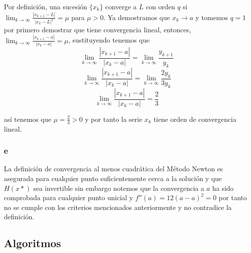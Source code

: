 \documentclass[conference]{IEEEtran}
\begin{document}
Por definición, una sucesión $\{x_k\}$ converge a $L$ con orden $q$ si
$\lim_{k \to \infty} \frac{|x_{k+1} - L|}{|x_k - L|^q} = \mu$ para $\mu > 0$. Ya demostramos que
$x_{k} \rightarrow a$ y tomemos $q=1$ por primero demostrar que tiene convergencia lineal,
entonces, $\lim_{k \to \infty} \frac{|x_{k+1} - a|}{|x_k - a|} = \mu$, sustituyendo tenemos que
$$
\lim_{k \to \infty} \frac{|x_{k+1} - a|}{|x_k - a|} = \lim_{k \to \infty} \frac{y_{k+1}}{y_k}
$$
$$
\lim_{k \to \infty} \frac{|x_{k+1} - a|}{|x_k - a|} = \lim_{k \to \infty} \frac{2y_{k}}{3y_k}
$$
$$
\lim_{k \to \infty} \frac{|x_{k+1} - a|}{|x_k - a|} = \frac{2}{3}
$$

así tenemos que $\mu = \frac{2}{3} > 0$ y por tanto la serie $x_k$ tiene orden de
convergencia lineal.\\


\subsubsection*{e}

La definición de convergencia al menos cuadrática del Método Newton es asegurada para cualquier
punto suficientemente cerca a la solución y que $H(x*)$ sea invertible sin embargo notemos que
la convergencia a $a$ ha sido comprobada para cualquier punto unicial y $f''(a) = 12(a - a)^2 = 0$
por tanto no se cumple con los criterios mencionados anteriormente y no contradice la definición.

\subsection{Algoritmos}
\end{document}
